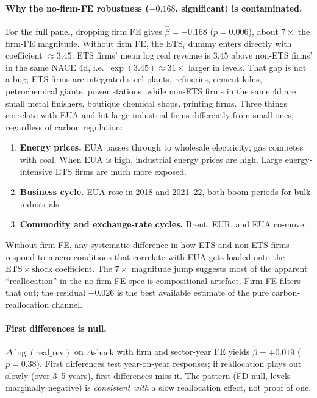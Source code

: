 \documentclass[11pt]{article}
\begin{document}
\paragraph{Why the no-firm-FE robustness ($-0.168$, significant) is contaminated.} For the full panel, dropping firm FE gives $\hat\beta = -0.168$ ($p = 0.006$), about $7\times$ the firm-FE magnitude. Without firm FE, the $\mathrm{ETS}_i$ dummy enters directly with coefficient $\approx 3.45$: ETS firms' mean log real revenue is $3.45$ above non-ETS firms' in the same NACE 4d, i.e.\ $\exp(3.45) \approx 31\times$ larger in levels. That gap is not a bug; ETS firms are integrated steel plants, refineries, cement kilns, petrochemical giants, power stations, while non-ETS firms in the same 4d are small metal finishers, boutique chemical shops, printing firms. Three things correlate with EUA and hit large industrial firms differently from small ones, regardless of carbon regulation:
\begin{enumerate}
  \item \textbf{Energy prices.} EUA passes through to wholesale electricity; gas competes with coal. When EUA is high, industrial energy prices are high. Large energy-intensive ETS firms are much more exposed.
  \item \textbf{Business cycle.} EUA rose in 2018 and 2021--22, both boom periods for bulk industrials.
  \item \textbf{Commodity and exchange-rate cycles.} Brent, EUR, and EUA co-move.
\end{enumerate}
Without firm FE, any systematic difference in how ETS and non-ETS firms respond to macro conditions that correlate with EUA gets loaded onto the $\mathrm{ETS} \times \mathrm{shock}$ coefficient. The $7\times$ magnitude jump suggests most of the apparent ``reallocation'' in the no-firm-FE spec is compositional artefact. Firm FE filters that out; the residual $-0.026$ is the best available estimate of the pure carbon-reallocation channel.

\paragraph{First differences is null.} $\Delta \log(\mathrm{real\_rev})$ on $\Delta \mathrm{shock}$ with firm and sector-year FE yields $\hat\beta = +0.019$ ($p = 0.38$). First differences test year-on-year responses; if reallocation plays out slowly (over 3--5 years), first differences miss it. The pattern (FD null, levels marginally negative) is \emph{consistent with} a slow reallocation effect, not proof of one.
\end{document}
